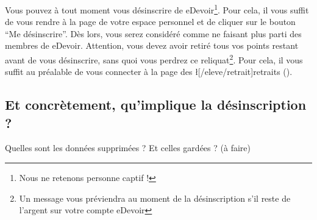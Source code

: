 ﻿Vous pouvez à tout moment vous désinscrire de eDevoir\footnote{Nous ne retenons personne captif !}. Pour cela, il vous suffit de vous rendre à la page  de votre espace personnel et de cliquer sur le bouton “Me désinscrire”. Dès lors, vous serez considéré comme ne faisant plus parti des membres de eDevoir. Attention, vous devez avoir retiré tous vos points restant avant de vous désinscrire, sans quoi vous perdrez ce reliquat\footnote{Un message vous préviendra au moment de la désinscription s’il reste de l’argent sur votre compte eDevoir}. Pour cela, il vous suffit au préalable de vous connecter à la page des \l[/eleve/retrait]{retraits} ().

\subsection{Et concrètement, qu’implique la désinscription ?}
Quelles sont les données supprimées ? Et celles gardées ? (à faire)